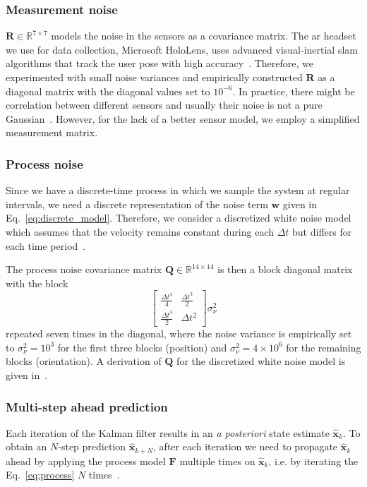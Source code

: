 \documentclass[sigconf]{acmart}			%
\newcommand{\matr}[1]{\mathrm{\mathbf{#1}}}
\begin{document}
\subsubsection*{Measurement noise}
$\matr{R}\in\mathbb{R}^{7\times 7}$ models the noise in the sensors as a covariance matrix.
The \gls{ar} headset we use for data collection, Microsoft HoloLens, uses advanced visual-inertial \gls{slam} algorithms that track the user pose with high accuracy~\cite{liu2018_hololens}.
Therefore, we experimented with small noise variances and empirically constructed $\matr{R}$ as a diagonal matrix with the diagonal values set to  $10^{-6}$.
In practice, there might be correlation between different sensors and usually their noise is not a pure Gaussian~\cite{labbe2015}.
However, for the lack of a better sensor model, we employ a simplified measurement matrix.

\subsubsection*{Process noise}
Since we have a discrete-time process in which we sample the system at regular intervals, we need a discrete representation of the noise term $\mathbf{w}$ given in Eq.~\ref{eq:discrete_model}.
Therefore, we consider a discretized white noise model which assumes that the velocity remains constant during each $\Delta t$ but differs for each time period~\cite{barshalom2004}.

The process noise covariance matrix $\matr{Q}\in\mathbb{R}^{14\times 14}$ is then a block diagonal matrix with the block
$$
\begin{bmatrix}
	\frac{\Delta t^4}{4} & \frac{\Delta t^3}{2} \\[0.5em]
	\frac{\Delta t^3}{2} & \Delta t^2
\end{bmatrix}
\sigma_\nu^2
$$
repeated seven times in the diagonal, where the noise variance is empirically set to $\sigma_\nu^2=10^3$ for the first three blocks (position) and $\sigma_\nu^2=4\times10^6$ for the remaining blocks (orientation). 
A derivation of $\matr{Q}$ for the discretized white noise model is given in~\cite{barshalom2004}.

\subsubsection*{Multi-step ahead prediction}
\label{sec:kf_prediction}
Each iteration of the Kalman filter results in an \textit{a posteriori} state estimate $\mathbf{\hat{x}}_{k}$.
To obtain an $N$-step prediction $\mathbf{\hat{x}}_{k+N}$, after each iteration we need to propagate $\mathbf{\hat{x}}_{k}$ ahead by applying the process model $\matr{F}$ multiple times on $\mathbf{\hat{x}}_{k}$, i.e. by iterating the Eq.~\eqref{eq:process} $N$ times~\cite{kiruluta1997, van_rhijn2005}. 
\end{document}
